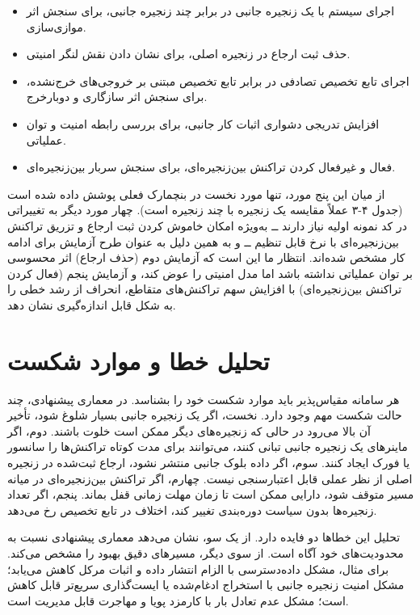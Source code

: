 \begin{itemize}
\item اجرای سیستم با یک زنجیره جانبی در برابر چند زنجیره جانبی، برای سنجش اثر موازی‌سازی.
\item حذف ثبت ارجاع در زنجیره اصلی، برای نشان دادن نقش لنگر امنیتی.
\item اجرای تابع تخصیص تصادفی در برابر تابع تخصیص مبتنی بر خروجی‌های خرج‌نشده، برای سنجش اثر سازگاری و دوبارخرج.
\item افزایش تدریجی دشواری اثبات کار جانبی، برای بررسی رابطه امنیت و توان عملیاتی.
\item فعال و غیرفعال کردن تراکنش بین‌زنجیره‌ای، برای سنجش سربار بین‌زنجیره‌ای.
\end{itemize}

از میان این پنج مورد، تنها مورد نخست در بنچمارک فعلی پوشش داده شده است (جدول ۴-۳ عملاً مقایسه یک زنجیره با چند زنجیره است). چهار مورد دیگر به تغییراتی در کد نمونه اولیه نیاز دارند ــ به‌ویژه امکان خاموش کردن ثبت ارجاع و تزریق تراکنش بین‌زنجیره‌ای با نرخ قابل تنظیم ــ و به همین دلیل به عنوان طرح آزمایش برای ادامه کار مشخص شده‌اند. انتظار ما این است که آزمایش دوم (حذف ارجاع) اثر محسوسی بر توان عملیاتی نداشته باشد اما مدل امنیتی را عوض کند، و آزمایش پنجم (فعال کردن تراکنش بین‌زنجیره‌ای) با افزایش سهم تراکنش‌های متقاطع، انحراف از رشد خطی را به شکل قابل اندازه‌گیری نشان دهد.

\section{تحلیل خطا و موارد شکست}

هر سامانه مقیاس‌پذیر باید موارد شکست خود را بشناسد. در معماری پیشنهادی، چند حالت شکست مهم وجود دارد. نخست، اگر یک زنجیره جانبی بسیار شلوغ شود، تأخیر آن بالا می‌رود در حالی که زنجیره‌های دیگر ممکن است خلوت باشند. دوم، اگر ماینرهای یک زنجیره جانبی تبانی کنند، می‌توانند برای مدت کوتاه تراکنش‌ها را سانسور یا فورک ایجاد کنند. سوم، اگر داده بلوک جانبی منتشر نشود، ارجاع ثبت‌شده در زنجیره اصلی از نظر عملی قابل اعتبارسنجی نیست. چهارم، اگر تراکنش بین‌زنجیره‌ای در میانه مسیر متوقف شود، دارایی ممکن است تا زمان مهلت زمانی قفل بماند. پنجم، اگر تعداد زنجیره‌ها بدون سیاست دوره‌بندی تغییر کند، اختلاف در تابع تخصیص رخ می‌دهد.

تحلیل این خطاها دو فایده دارد. از یک سو، نشان می‌دهد معماری پیشنهادی نسبت به محدودیت‌های خود آگاه است. از سوی دیگر، مسیرهای دقیق بهبود را مشخص می‌کند. برای مثال، مشکل داده‌دسترسی با الزام انتشار داده و اثبات مرکل کاهش می‌یابد؛ مشکل امنیت زنجیره جانبی با استخراج ادغام‌شده یا ایست‌گذاری سریع‌تر قابل کاهش است؛ مشکل عدم تعادل بار با کارمزد پویا و مهاجرت قابل مدیریت است.

